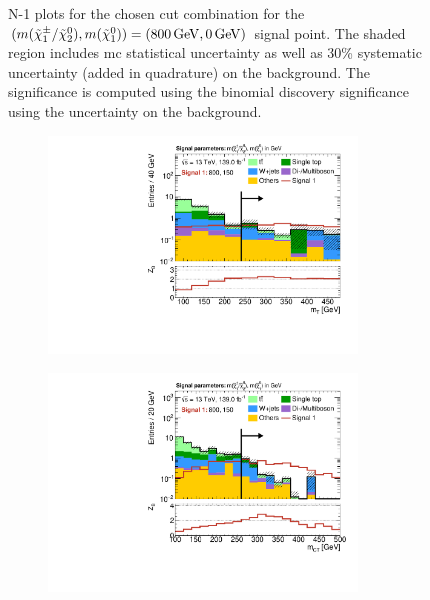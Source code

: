 \begin{figure}
	\caption[N-1 plots for the chosen cut combination for the (800, 0) signal point]{N-1 plots for the chosen cut combination for the $(m(\charg/\neutr), m(\lsp)) = (\SI{800}{\GeV}, \SI{0}{\GeV})$ signal point. The shaded region includes \gls{mc} statistical uncertainty as well as 30\% systematic uncertainty (added in quadrature) on the background. The significance is computed using the binomial discovery significance using the uncertainty on the background.}
	\label{fig:results_n1_800_0}
\end{figure}



\begin{figure}
	\centering
	\begin{subfigure}[b]{0.5\linewidth}
		\centering\includegraphics[width=0.9\textwidth]{N-1_cut_scan/n1_800_150/mt}
	\end{subfigure}\hfill
	\begin{subfigure}[b]{0.5\linewidth}
		\centering\includegraphics[width=0.9\textwidth]{N-1_cut_scan/n1_800_150/mct}

\end{subfigure}
\end{figure}
